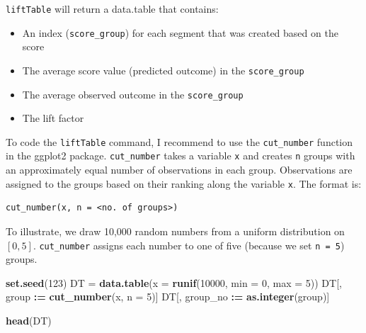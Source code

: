 \documentclass[
]{article}
\newenvironment{Shaded}{\begin{snugshade}}{\end{snugshade}}
\newcommand{\AttributeTok}[1]{\textcolor[rgb]{0.13,0.29,0.53}{#1}}
\newcommand{\DecValTok}[1]{\textcolor[rgb]{0.00,0.00,0.81}{#1}}
\newcommand{\FunctionTok}[1]{\textcolor[rgb]{0.13,0.29,0.53}{\textbf{#1}}}
\newcommand{\NormalTok}[1]{#1}
\newcommand{\OtherTok}[1]{\textcolor[rgb]{0.56,0.35,0.01}{#1}}
\newcommand{\SpecialCharTok}[1]{\textcolor[rgb]{0.81,0.36,0.00}{\textbf{#1}}}
\providecommand{\tightlist}{%
  \setlength{\itemsep}{0pt}\setlength{\parskip}{0pt}}
\begin{document}
\texttt{liftTable} will return a data.table that contains:

\begin{itemize}
\tightlist
\item
  An index (\texttt{score\_group}) for each segment that was created
  based on the score
\item
  The average score value (predicted outcome) in the
  \texttt{score\_group}
\item
  The average observed outcome in the \texttt{score\_group}
\item
  The lift factor
\end{itemize}

\bigskip

To code the \texttt{liftTable} command, I recommend to use the
\texttt{cut\_number} function in the ggplot2 package.
\texttt{cut\_number} takes a variable \texttt{x} and creates \texttt{n}
groups with an approximately equal number of observations in each group.
Observations are assigned to the groups based on their ranking along the
variable \texttt{x}. The format is:

\begin{verbatim}
cut_number(x, n = <no. of groups>)
\end{verbatim}

\medskip

To illustrate, we draw 10,000 random numbers from a uniform distribution
on \([0,5]\). \texttt{cut\_number} assigns each number to one of five
(because we set \texttt{n\ =\ 5}) groups.

\begin{Shaded}
\begin{Highlighting}[]
\FunctionTok{set.seed}\NormalTok{(}\DecValTok{123}\NormalTok{)}
\NormalTok{DT }\OtherTok{=} \FunctionTok{data.table}\NormalTok{(}\AttributeTok{x =} \FunctionTok{runif}\NormalTok{(}\DecValTok{10000}\NormalTok{, }\AttributeTok{min =} \DecValTok{0}\NormalTok{, }\AttributeTok{max =} \DecValTok{5}\NormalTok{))}
\NormalTok{DT[, group    }\SpecialCharTok{:=} \FunctionTok{cut\_number}\NormalTok{(x, }\AttributeTok{n =} \DecValTok{5}\NormalTok{)]}
\NormalTok{DT[, group\_no }\SpecialCharTok{:=} \FunctionTok{as.integer}\NormalTok{(group)]}
\end{Highlighting}
\end{Shaded}

\begin{Shaded}
\begin{Highlighting}[]
\FunctionTok{head}\NormalTok{(DT)}
\end{Highlighting}
\end{Shaded}
\end{document}
